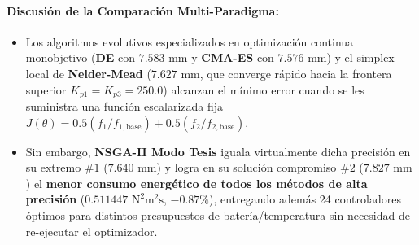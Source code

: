\documentclass[11pt,a4paper]{article}
\begin{document}
\paragraph{Discusión de la Comparación Multi-Paradigma:}
\begin{itemize}
    \item Los algoritmos evolutivos especializados en optimización continua monobjetivo (\textbf{DE} con $7.583\text{ mm}$ y \textbf{CMA-ES} con $7.576\text{ mm}$) y el simplex local de \textbf{Nelder-Mead} ($7.627\text{ mm}$, que converge rápido hacia la frontera superior $K_{p1}=K_{p3}=250.0$) alcanzan el mínimo error cuando se les suministra una función escalarizada fija $J(\theta) = 0.5(f_1/f_{1,\text{base}}) + 0.5(f_2/f_{2,\text{base}})$.
    \item Sin embargo, \textbf{NSGA-II Modo Tesis} iguala virtualmente dicha precisión en su extremo $\#1$ ($7.640\text{ mm}$) y logra en su solución compromiso $\#2$ ($7.827\text{ mm}$) el \textbf{menor consumo energético de todos los métodos de alta precisión} ($0.511447\text{ N}^2\text{m}^2\text{s}$, $-0.87\%$), entregando además 24 controladores óptimos para distintos presupuestos de batería/temperatura sin necesidad de re-ejecutar el optimizador.
\end{itemize}
\end{document}
